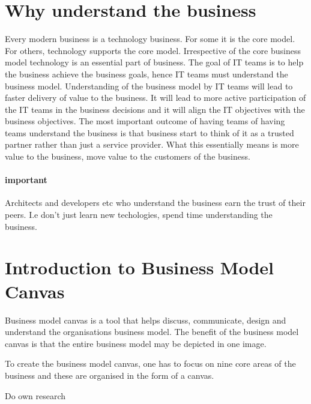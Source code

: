 \documentclass[a4paper, 11pt]{book}
\begin{document}
    \section{Why understand the business}
    Every modern business is a technology business. For some it is the core model. For others, technology supports the core model.
    Irrespective of the core business model technology is an essential part of business.
    The goal of IT teams is to help the business achieve the business goals, hence IT teams must understand the business model.
    Understanding of the business model by IT teams will lead to faster delivery of value to the business.
    It will lead to more active participation of the IT teams in the business decisions and it will align the IT objectives with the business objectives.
    The most important outcome of having teams of having teams understand the business is that business start to think of it as a trusted partner rather than just a service provider.
    What this essentially means is more value to the business, move value to the customers of the business.

    \paragraph{important}
    Architects and developers etc who understand the business earn the trust of their peers.
    I.e don't just learn new techologies, spend time understanding the business.


    \section{Introduction to Business Model Canvas}
    Business model canvas is a tool that helps discuss, communicate, design and understand the organisations business model.
    The benefit of the business model canvas is that the entire business model may be depicted in one image.

    To create the business model canvas, one has to focus on nine core areas of the business and these are organised in the form of a canvas.

    Do own research
\end{document}
